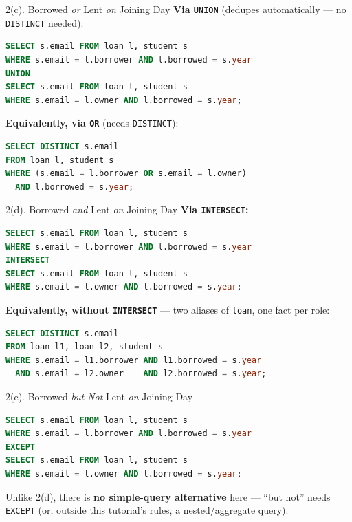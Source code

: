 \documentclass{beamer}
\begin{document}
\begin{frame}[fragile]{2(c). Borrowed \emph{or} Lent \emph{on} Joining Day}
\small
\textbf{Via \texttt{UNION}} (dedupes automatically --- no \texttt{DISTINCT} needed):
\begin{lstlisting}[language=SQL]
SELECT s.email FROM loan l, student s
WHERE s.email = l.borrower AND l.borrowed = s.year
UNION
SELECT s.email FROM loan l, student s
WHERE s.email = l.owner AND l.borrowed = s.year;
\end{lstlisting}
\textbf{Equivalently, via \texttt{OR}} (needs \texttt{DISTINCT}):
\begin{lstlisting}[language=SQL]
SELECT DISTINCT s.email
FROM loan l, student s
WHERE (s.email = l.borrower OR s.email = l.owner)
  AND l.borrowed = s.year;
\end{lstlisting}
\end{frame}

\begin{frame}[fragile]{2(d). Borrowed \emph{and} Lent \emph{on} Joining Day}
\small
\textbf{Via \texttt{INTERSECT}:}
\begin{lstlisting}[language=SQL]
SELECT s.email FROM loan l, student s
WHERE s.email = l.borrower AND l.borrowed = s.year
INTERSECT
SELECT s.email FROM loan l, student s
WHERE s.email = l.owner AND l.borrowed = s.year;
\end{lstlisting}
\textbf{Equivalently, without \texttt{INTERSECT}} --- two aliases of \texttt{loan}, one fact per role:
\begin{lstlisting}[language=SQL]
SELECT DISTINCT s.email
FROM loan l1, loan l2, student s
WHERE s.email = l1.borrower AND l1.borrowed = s.year
  AND s.email = l2.owner    AND l2.borrowed = s.year;
\end{lstlisting}
\end{frame}

\begin{frame}[fragile]{2(e). Borrowed \emph{but Not} Lent \emph{on} Joining Day}
\small
\begin{lstlisting}[language=SQL]
SELECT s.email FROM loan l, student s
WHERE s.email = l.borrower AND l.borrowed = s.year
EXCEPT
SELECT s.email FROM loan l, student s
WHERE s.email = l.owner AND l.borrowed = s.year;
\end{lstlisting}
Unlike 2(d), there is \textbf{no simple-query alternative} here --- ``but not'' needs \texttt{EXCEPT} (or, outside this tutorial's rules, a nested/aggregate query).
\end{frame}
\end{document}
